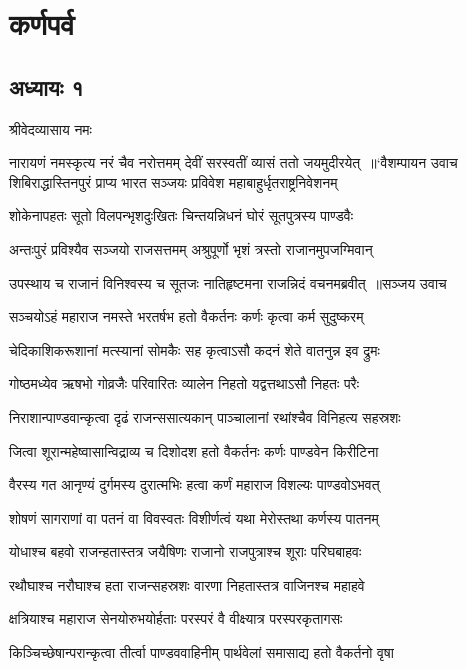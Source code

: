 \part{कर्णपर्व}
\chapter{अध्यायः १}
\twolineshloka
{श्रीवेदव्यासाय नमः}
{}


\fourlineindentedshloka
{नारायणं नमस्कृत्य नरं चैव नरोत्तमम्}
{देवीं सरस्वतीं व्यासं ततो जयमुदीरयेत् ॥`वैशम्पायन उवाच}
{शिबिराद्धास्तिनपुरं प्राप्य भारत सञ्जयः}
{प्रविवेश महाबाहुर्धृतराष्ट्रनिवेशनम्}


\twolineshloka
{शोकेनापहतः सूतो विलपन्भृशदुःखितः}
{चिन्तयन्निधनं घोरं सूतपुत्रस्य पाण्डवैः}


\twolineshloka
{अन्तःपुरं प्रविश्यैव सञ्जयो राजसत्तमम्}
{अश्रुपूर्णो भृशं त्रस्तो राजानमुपजग्मिवान्}


\threelineshloka
{उपस्थाय च राजानं विनिश्वस्य च सूतजः}
{नातिहृष्टमना राजन्निदं वचनमब्रवीत् ॥सञ्जय उवाच}
{}


\twolineshloka
{सञ्चयोऽहं महाराज नमस्ते भरतर्षभ}
{हतो वैकर्तनः कर्णः कृत्वा कर्म सुदुष्करम्}


\twolineshloka
{चेदिकाशिकरूशानां मत्स्यानां सोमकैः सह}
{कृत्वाऽसौ कदनं शेते वातनुन्न इव द्रुमः}


\twolineshloka
{गोष्ठमध्येव ऋषभो गोव्रजैः परिवारितः}
{व्यालेन निहतो यद्वत्तथाऽसौ निहतः परैः}


\twolineshloka
{निराशान्पाण्डवान्कृत्वा दृढं राजन्ससात्यकान्}
{पाञ्चालानां रथांश्चैव विनिहत्य सहस्रशः}


\twolineshloka
{जित्वा शूरान्महेष्वासान्विद्राव्य च दिशोदश}
{हतो वैकर्तनः कर्णः पाण्डवेन किरीटिना}


\twolineshloka
{वैरस्य गत आनृण्यं दुर्गमस्य दुरात्मभिः}
{हत्वा कर्णं महाराज विशल्यः पाण्डवोऽभवत्}


\twolineshloka
{शोषणं सागराणां वा पतनं वा विवस्वतः}
{विशीर्णत्वं यथा मेरोस्तथा कर्णस्य पातनम्}


\twolineshloka
{योधाश्च बहवो राजन्हतास्तत्र जयैषिणः}
{राजानो राजपुत्राश्च शूराः परिघबाहवः}


\twolineshloka
{रथौघाश्च नरौघाश्च हता राजन्सहस्रशः}
{वारणा निहतास्तत्र वाजिनश्च महाहवे}


\twolineshloka
{क्षत्रियाश्च महाराज सेनयोरुभयोर्हताः}
{परस्परं वै वीक्ष्यात्र परस्परकृतागसः}


\twolineshloka
{किञ्चिच्छेषान्परान्कृत्वा तीर्त्वा पाण्डववाहिनीम्}
{पार्थवेलां समासाद्य हतो वैकर्तनो वृषा}


